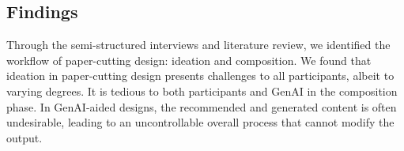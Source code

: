 

\subsection{Findings}

Through the semi-structured interviews and literature review, we identified the workflow of paper-cutting design: ideation and composition. We found that ideation in paper-cutting design presents challenges to all participants, albeit to varying degrees. It is tedious to both participants and GenAI in the composition phase. In GenAI-aided designs, the recommended and generated content is often undesirable, leading to an uncontrollable overall process that cannot modify the output.

